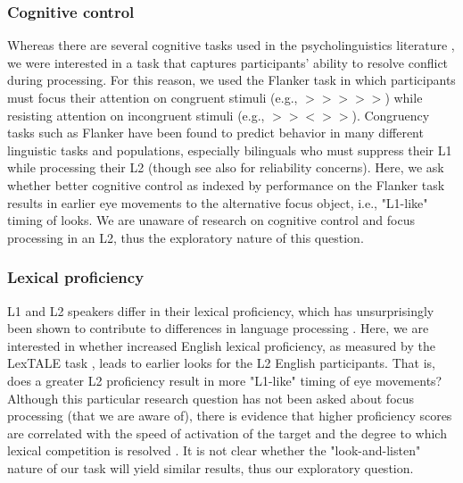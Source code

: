 \subsubsection{Cognitive control}
Whereas there are several cognitive tasks used in the psycholinguistics literature \citep{ness2023state}, we were interested in a task that captures participants' ability to resolve conflict during processing. For this reason, we used the Flanker task \citep{eriksen1974effects} in which 
participants must focus their attention on congruent stimuli (e.g., $>>>>>$) while resisting attention on incongruent stimuli (e.g., $>><>>$). Congruency tasks such as Flanker have been found to predict behavior in many different linguistic tasks and populations, especially bilinguals who must suppress their L1 while processing their L2 \citep{blumenfeld2014cognitive,luk2011there} (though see also \cite{hedge2018reliability} for reliability concerns). Here, we ask whether better cognitive control as indexed by performance on the Flanker task results in earlier eye movements to the alternative focus object, i.e., "L1-like" timing of looks. We are unaware of research on cognitive control and focus processing in an L2, thus the exploratory nature of this question.



\subsubsection{Lexical proficiency}
L1 and L2 speakers differ in their lexical proficiency, which has unsurprisingly been shown to contribute to differences in language processing \citep{Yap2012, zareva2005relationship}. Here, we are interested in whether increased English lexical proficiency, as measured by the LexTALE task \citep{lemhofer2012introducing}, leads to earlier looks for the L2 English participants. That is, does a greater L2 proficiency result in more "L1-like" timing of eye movements? Although this particular research question has not been asked about focus processing (that we are aware of), there is evidence that higher proficiency scores are correlated with the speed of activation of the target and the degree to which lexical competition is resolved \citep{sarrett2022within}. It is not clear whether the "look-and-listen" nature of our task will yield similar results, thus our exploratory question.

 

